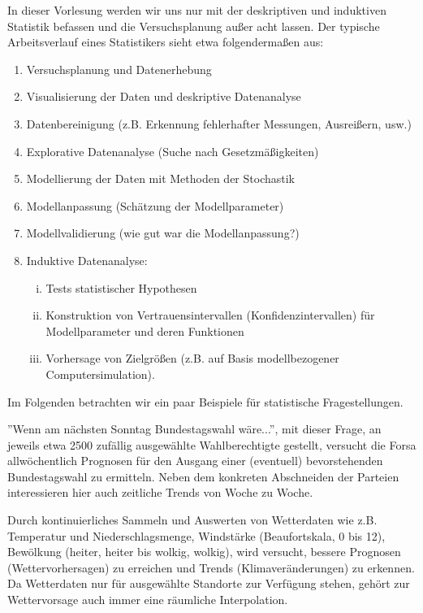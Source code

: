In dieser Vorlesung werden wir uns nur mit der deskriptiven und induktiven
Statistik befassen und die Versuchsplanung außer acht lassen.
Der typische Arbeitsverlauf eines Statistikers sieht etwa folgendermaßen aus:
\begin{enumerate}
\item Versuchsplanung und Datenerhebung
\item Visualisierung der Daten und deskriptive Datenanalyse
\item Datenbereinigung (z.B. Erkennung fehlerhafter Messungen, Ausreißern, usw.)
\item Explorative Datenanalyse (Suche nach Gesetzmäßigkeiten)
\item Modellierung der Daten mit Methoden der Stochastik
\item Modellanpassung (Schätzung der Modellparameter)
\item Modellvalidierung (wie gut war die Modellanpassung?)
\item Induktive Datenanalyse:
  \begin{enumerate}[(i)]
  \item Tests statistischer Hypothesen
  \item Konstruktion von Vertrauensintervallen (Konfidenzintervallen) für
    Modellparameter und deren Funktionen
  \item Vorhersage von Zielgrößen (z.B. auf Basis modellbezogener
    Computersimulation).
  \end{enumerate}
\end{enumerate}

Im Folgenden betrachten wir ein paar Beispiele für statistische Fragestellungen.

\begin{exmp}[Sonntagsfrage] ”Wenn am nächsten Sonntag Bundestagswahl wäre...”,
  mit dieser Frage, an jeweils etwa 2500 zufällig ausgewählte Wahlberechtigte
  gestellt, versucht die Forsa allwöchentlich Prognosen für den Ausgang einer
  (eventuell) bevorstehenden Bundestagswahl zu ermitteln. Neben dem konkreten
  Abschneiden der Parteien interessieren hier auch zeitliche Trends von Woche zu
  Woche.
\end{exmp}

\begin{exmp}[Wetteraufzeichnung]
  Durch kontinuierliches Sammeln und Auswerten von Wetterdaten wie z.B.
  Temperatur und Niederschlagsmenge, Windstärke (Beaufortskala, 0 bis 12),
  Bewölkung (heiter, heiter bis wolkig, wolkig), wird versucht, bessere
  Prognosen (Wettervorhersagen) zu erreichen und Trends (Klimaveränderungen) zu
  erkennen. Da Wetterdaten nur für ausgewählte Standorte zur Verfügung stehen,
  gehört zur Wettervorsage auch immer eine räumliche Interpolation.
\end{exmp}

